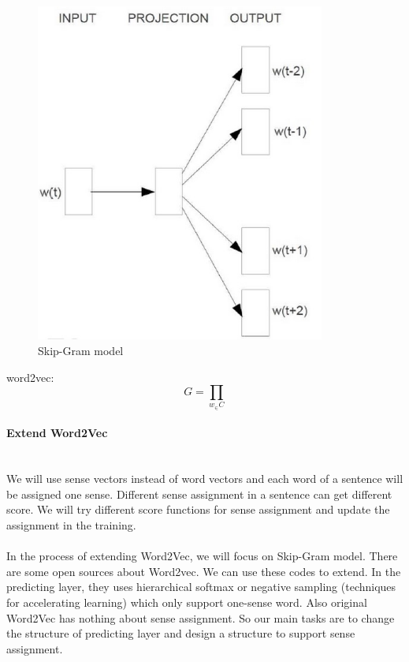 \documentclass{scrartcl}
\begin{document}
\begin{figure}[H]
\begin{minipage}{.5\textwidth}
	\includegraphics[width=0.85\textwidth]{Skip-Gram}
	\caption{Skip-Gram model}
	\label{fig:Skip-Gram}
\end{minipage}
\end{figure}	

word2vec: 
$$G=\prod_{w_\in C} $$
 
\paragraph{Extend Word2Vec}
\hfill \\
We will use sense vectors instead of word vectors and each word of a sentence will be assigned one sense. Different sense assignment in a sentence can get different score. We will try different score functions for sense assignment and update the assignment in the training. \\
\\
In the process of extending Word2Vec, we will focus on Skip-Gram model. There are some open sources about Word2vec. We can use these codes to extend. In the predicting layer, they uses hierarchical softmax or negative sampling (techniques for accelerating learning) which only support one-sense word. Also original Word2Vec has nothing about sense assignment. So our main tasks are to change the structure of predicting layer and design a structure to support sense assignment. \\
\end{document}
